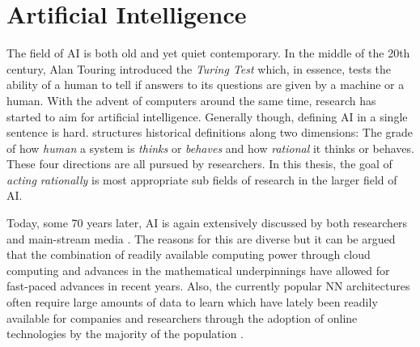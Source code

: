 


\section{Artificial Intelligence}%
\label{sec:artificial_intelligence}


The field of \ac{AI} is both old and yet quiet contemporary. In the middle of the 20th century, Alan Touring introduced
the \emph{Turing Test} which, in essence, tests the ability of a human to tell if answers to its questions are given by
a machine or a human. With the advent of computers around the same time, research has started to aim for artificial
intelligence. Generally though, defining \ac{AI} in a single sentence is hard.  \citet{russell2016artificial} structures
historical definitions along two dimensions: The grade of how \emph{human} a system is \emph{thinks} or \emph{behaves}
and how \emph{rational} it thinks or behaves. These four directions are all pursued by researchers. In this thesis, the
goal of \emph{acting rationally} is most appropriate sub fields of research in the larger field of \ac{AI}.


Today, some 70 years later, \ac{AI} is again extensively discussed by both researchers and main-stream media
\citep[p.24ff.]{russell2016artificial, arulkumaran2017brief}. The reasons for this are diverse but it can be argued that
the combination of readily available computing power through cloud computing and advances in the mathematical
underpinnings have allowed for fast-paced advances in recent years. Also, the currently popular \acf {NN}
architectures often require large amounts of data to learn which have lately been readily available for companies and
researchers through the adoption of online technologies by the majority of the population
\citep[p.27]{russell2016artificial}.
